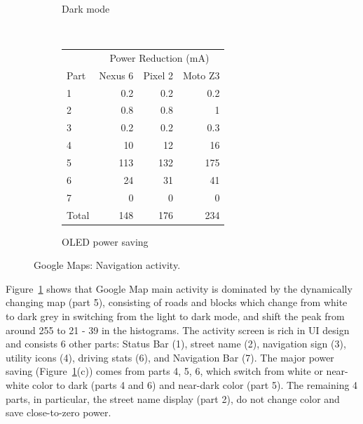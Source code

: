 \begin{figure}[tp]
\begin{subfigure}[]{\columnwidth}
		\caption{Dark mode}
	\end{subfigure}
	\\
	\begin{subfigure}[]{\columnwidth}
	\centering
	{ \small
	\begin{tabular}{ | l | r | r | r | }
		\hline
		     & \multicolumn{3}{|c|}{Power Reduction (mA)}\\
		\cline{2-4}
                Part & Nexus 6 & Pixel 2 & Moto Z3 \\
		\hline
		1 & 0.2  & 0.2  & 0.2  \\
		2 & 0.8  & 0.8  &   1  \\
		3 & 0.2  & 0.2  & 0.3  \\
		4 &  10  &  12  &  16  \\
		5 & 113  & 132  & 175  \\
		6 &  24  &  31  &  41  \\
		7 &   0  &   0  &   0  \\
		\hline
		Total   & 148 &  176 &  234  \\
		\hline
	\end{tabular}
	}
	\caption{OLED power saving}		
        \vspace{-0.1in}
	\end{subfigure}
	\caption{Google Maps: Navigation activity.}
	\label{fig:case_study_maps}
\end{figure}

Figure~\ref{fig:case_study_maps} shows
that Google Map main activity is dominated
by the dynamically changing map (part 5),
consisting of roads and blocks which
change from white to dark grey in switching from the light to dark mode,
and shift the peak from around 255 to 21 - 39 in the histograms.
The activity screen is rich in UI design and consists 6 other parts:
Status Bar (1),
street name (2),
navigation sign (3),
utility icons (4),
driving stats (6),
and Navigation Bar (7).
The major power saving (Figure~\ref{fig:case_study_maps}(c))
comes from parts 4, 5, 6, which switch from
white or near-white color to dark (parts 4 and 6) and near-dark color (part 5).
The remaining 4 parts, in particular, the street name display (part 2), do not
change color and save close-to-zero power.

